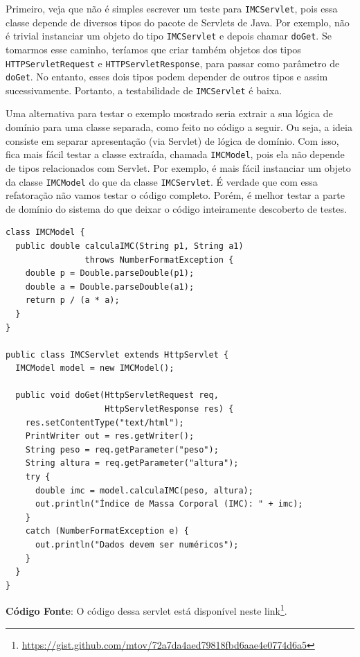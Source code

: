 \documentclass[
  11pt,
  twoside]{book}
\newcommand{\passthrough}[1]{#1}
\DeclareRobustCommand{\href}[2]{#2\footnote{\url{#1}}}
\begin{document}
Primeiro, veja que não é simples escrever um teste para
\passthrough{\lstinline!IMCServlet!}, pois essa classe depende de
diversos tipos do pacote de Servlets de Java. Por exemplo, não é trivial
instanciar um objeto do tipo \passthrough{\lstinline!IMCServlet!} e
depois chamar \passthrough{\lstinline!doGet!}. Se tomarmos esse caminho,
teríamos que criar também objetos dos tipos
\passthrough{\lstinline!HTTPServletRequest!} e
\passthrough{\lstinline!HTTPServletResponse!}, para passar como
parâmetro de \passthrough{\lstinline!doGet!}. No entanto, esses dois
tipos podem depender de outros tipos e assim sucessivamente. Portanto, a
testabilidade de \passthrough{\lstinline!IMCServlet!} é baixa.

Uma alternativa para testar o exemplo mostrado seria extrair a sua
lógica de domínio para uma classe separada, como feito no código a
seguir. Ou seja, a ideia consiste em separar apresentação (via Servlet)
de lógica de domínio. Com isso, fica mais fácil testar a classe
extraída, chamada \passthrough{\lstinline!IMCModel!}, pois ela não
depende de tipos relacionados com Servlet. Por exemplo, é mais fácil
instanciar um objeto da classe \passthrough{\lstinline!IMCModel!} do que
da classe \passthrough{\lstinline!IMCServlet!}. É verdade que com essa
refatoração não vamos testar o código completo. Porém, é melhor testar a
parte de domínio do sistema do que deixar o código inteiramente
descoberto de testes.

\begin{lstlisting}
class IMCModel {
  public double calculaIMC(String p1, String a1) 
                throws NumberFormatException {
    double p = Double.parseDouble(p1);
    double a = Double.parseDouble(a1);
    return p / (a * a);
  }
}

public class IMCServlet extends HttpServlet {
  IMCModel model = new IMCModel();

  public void doGet(HttpServletRequest req, 
                    HttpServletResponse res) {
    res.setContentType("text/html");
    PrintWriter out = res.getWriter();
    String peso = req.getParameter("peso");
    String altura = req.getParameter("altura");
    try {
      double imc = model.calculaIMC(peso, altura);
      out.println("Índice de Massa Corporal (IMC): " + imc);
    }
    catch (NumberFormatException e) {
      out.println("Dados devem ser numéricos");
    }
  }
}  
\end{lstlisting}

\textbf{Código Fonte}: O código dessa servlet está disponível neste
\href{https://gist.github.com/mtov/72a7da4aed79818fbd6aae4e0774d6a5}{link}.
\end{document}
